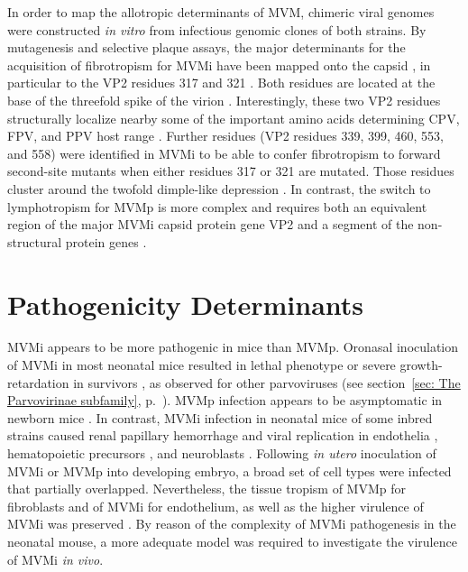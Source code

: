 In order to map the allotropic determinants of MVM, chimeric viral genomes were constructed \textit{in vitro} from infectious genomic clones of both strains. By mutagenesis and selective plaque assays, the major determinants for the acquisition of fibrotropism for MVMi have been mapped onto the capsid \cite{pmid3257270, pmid9519837, pmid1871965}, in particular to the VP2 residues 317 and 321 \cite{pmid7637028, pmid1316457}. Both residues are located at the base of the threefold spike of the virion \cite{pmid3357208, pmid3392768, pmid3257270}. Interestingly, these two VP2 residues structurally localize nearby some of the important amino acids determining CPV, FPV, and PPV host range \cite{pmid14581558, pmid12941920, pmid1532105}. Further residues (VP2 residues 339, 399, 460, 553, and 558) were identified in MVMi to be able to confer fibrotropism to forward second-site mutants when either residues 317 or 321 are mutated. Those residues cluster around the twofold dimple-like depression \cite{pmid9817841}. In contrast, the switch to lymphotropism for MVMp is more complex and requires both an equivalent region of the major MVMi capsid protein gene VP2 and a segment of the non-structural protein genes \cite{pmid9519837}.    


\section{Pathogenicity Determinants}

MVMi appears to be more pathogenic in mice than MVMp. Oronasal inoculation of MVMi in most neonatal mice resulted in lethal phenotype or severe growth-retardation in survivors \cite{pmid3712557}, as observed for other parvoviruses (see section~\ref{sec: The Parvovirinae subfamily}, p.~\pageref{sec: The Parvovirinae subfamily}). MVMp infection appears to be asymptomatic in newborn mice \cite{pmid1373202}. In contrast, MVMi infection in neonatal mice of some inbred strains caused renal papillary hemorrhage and viral replication in endothelia \cite{pmid1653878}, hematopoietic precursors \cite{pmid7707557}, and neuroblasts \cite{pmid8892936}. Following \textit{in utero} inoculation of MVMi or MVMp into developing embryo, a broad set of cell types were infected that partially overlapped. Nevertheless, the tissue tropism of MVMp for fibroblasts and of MVMi for endothelium, as well as the higher virulence of MVMi was preserved \cite{pmid15308740}. 
By reason of the complexity of MVMi pathogenesis in the neonatal mouse, a more adequate model was required to investigate the virulence of MVMi \textit{in vivo}. 

